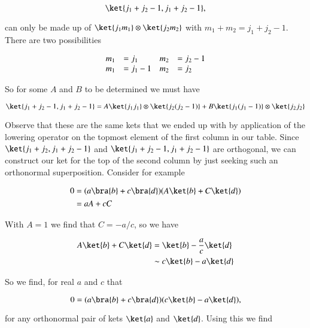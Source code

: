 \begin{equation}\label{eqn:qmTwoL18:50}
\ket{j_1 + j_2 - 1, j_1 + j_2 -1} ,
\end{equation}

can only be made up of $\ket{j_1 m_1} \otimes \ket{j_2 m_2}$ with $m_1 + m_2 = j_1 + j_2 -1$.  There are two possibilities

\begin{equation}\label{eqn:qmTwoL18:70}
\begin{array}{l l l l}
m_1 &= j_1 	& m_2 &= j_2 - 1 \\
m_1 &= j_1 - 1  & m_2 &= j_2
\end{array}
\end{equation}

So for some $A$ and $B$ to be determined we must have

\begin{equation}\label{eqn:qmTwoL18:90}
\ket{j_1 + j_2 - 1, j_1 + j_2 -1} 
=
A
\ket{j_1 j_1} \otimes \ket{j_2 (j_2-1)}
+
B
\ket{j_1 (j_1-1)} \otimes \ket{j_2 j_2}
\end{equation}

Observe that these are the same kets that we ended up with by application of the lowering operator on the topmost element of the first column in our table.  Since $\ket{j_1 + j_2, j_1 + j_2 -1}$ and $\ket{j_1 + j_2 - 1, j_1 + j_2 -1}$ are orthogonal, we can construct our ket for the top of the second column by just seeking such an orthonormal superposition.  Consider for example

\begin{align*}
0 
&=
(a \bra{b} + c \bra{d})( A \ket{b} + C \ket{d}) \\
&=
a A + c C
\end{align*}

With $A = 1$ we find that $C = -a/c$, so we have

\begin{align*}
A \ket{b} + C \ket{d} 
&= 
\ket{b} - \frac{a}{c} \ket{d}  \\
&\sim
c \ket{b} - a \ket{d}  \\
\end{align*}

So we find, for real $a$ and $c$ that

\begin{equation}\label{eqn:qmTwoL18:590}
0 = (a \bra{b} + c \bra{d})( c \ket{b} - a \ket{d}),
\end{equation}

for any orthonormal pair of kets $\ket{a}$ and $\ket{d}$.  Using this we find


